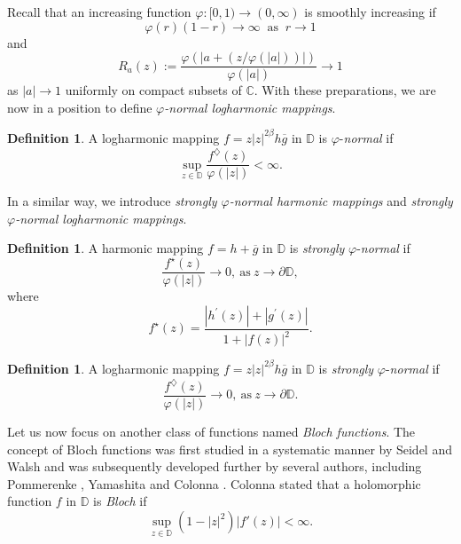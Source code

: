 \documentclass[11pt, reqno]{amsart}
\theoremstyle{definition}
\newtheorem{definition}[theorem]{Definition}
\theoremstyle{remark}
\numberwithin{equation}{section}
\begin{document}
Recall that an increasing function $\varphi : [0, 1)\to (0,\infty)$ is smoothly increasing if
\begin{equation*}\varphi(r)(1-r)\to \infty\ \text{ as }\ r \to 1\end{equation*}
and
\begin{equation*}R_a(z) := \frac{\varphi(|a + (z/\varphi(|a|))|)}
{\varphi(|a|)}\to 1\end{equation*} as $|a|\to 1$ uniformly on compact subsets of $\mathbb C$. With 
these preparations, we are now in a position to 
define \emph{$\varphi$-normal logharmonic mappings}.
\begin{definition}
A logharmonic mapping $f=z|z|^{2\beta}h\overline{g}$ in $\mathbb{D}$ is
$\varphi$-\emph{normal} if \begin{equation*}
\sup_{z\in\mathbb{D}}\frac{f^\diamondsuit(z)}{\varphi(|z|)}<\infty.
\end{equation*}
\end{definition}
In a similar way, we introduce \emph{strongly $\varphi$-normal harmonic mappings} and \emph{strongly $\varphi$-normal logharmonic mappings}.
\begin{definition}
A harmonic mapping $f=h+\overline{g}$ in $\mathbb D$ is \emph{strongly} $\varphi$-\emph{normal} if
\begin{equation*}\frac{f^\star(z)}{\varphi(|z|)}\to 0,\ \text{as}\ z\to \partial\mathbb D,\end{equation*}
 where \begin{equation*}f^\star(z)=\dfrac{|h^\prime(z)|+|g^\prime(z)|}{1+|f(z)|^2}.\end{equation*}
\end{definition}
\begin{definition}
A logharmonic mapping $f=z|z|^{2\beta}h\overline{g}$ in $\mathbb D$ is \emph{strongly} $\varphi$-\emph{normal} if
\begin{equation*}\frac{f^\diamondsuit(z)}{\varphi(|z|)}\to 0,\ \text{as}\ z\to \partial\mathbb D.\end{equation*}
\end{definition}
\smallskip
 Let us now focus on another class of functions named \emph{Bloch functions}. The concept of Bloch 
 functions was first studied in a systematic manner by Seidel and Walsh \cite{seidel-otdofaitucatrouaopv-1942} and was subsequently developed further by 
 several authors, including Pommerenke \cite{pommerenke-obf-1970}, Yamashita \cite{yamashita-cfftbb-1980} and Colonna \cite{colonna-banfatr-1989}. Colonna stated that a holomorphic function $f$ in $\mathbb D$ is \emph{Bloch} if 
 \begin{equation*}
     \sup_{z\in\mathbb D}(1-|z|^2)|f'(z)|<\infty.
 \end{equation*}
 
\end{document}
